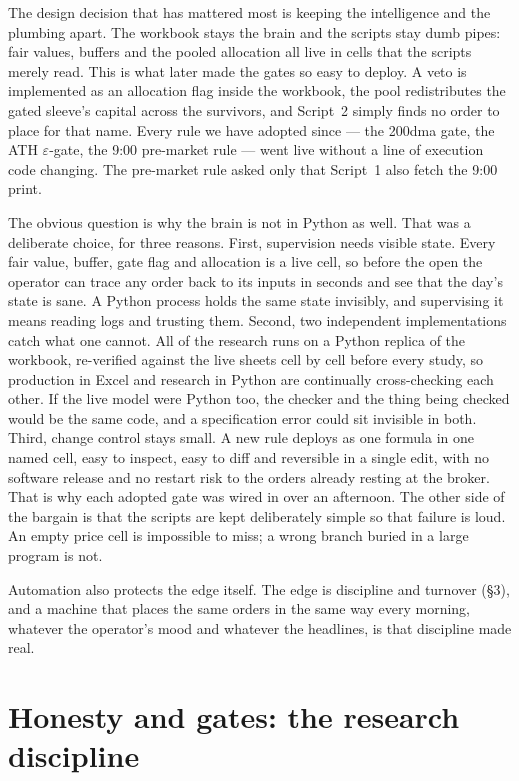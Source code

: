 \documentclass[11pt,a4paper]{article}
\begin{document}
The design decision that has mattered most is keeping the intelligence and
the plumbing apart. The workbook stays the brain and the scripts stay dumb
pipes: fair values, buffers and the pooled allocation all live in cells that
the scripts merely read. This is what later made the gates so easy to deploy.
A veto is implemented as an allocation flag inside the workbook, the pool
redistributes the gated sleeve's capital across the survivors, and Script~2
simply finds no order to place for that name. Every rule we have adopted
since --- the 200dma gate, the ATH $\varepsilon$-gate, the 9:00 pre-market
rule --- went live without a line of execution code changing. The pre-market
rule asked only that Script~1 also fetch the 9:00 print.

The obvious question is why the brain is not in Python as well. That was a
deliberate choice, for three reasons. First, supervision needs visible state.
Every fair value, buffer, gate flag and allocation is a live cell, so before
the open the operator can trace any order back to its inputs in seconds and
see that the day's state is sane. A Python process holds the same state
invisibly, and supervising it means reading logs and trusting them. Second,
two independent implementations catch what one cannot. All of the research
runs on a Python replica of the workbook, re-verified against the live
sheets cell by cell before every study, so production in Excel and research
in Python are continually cross-checking each other. If the live model were
Python too, the checker and the thing being checked would be the same code,
and a specification error could sit invisible in both. Third, change control
stays small. A new rule deploys as one formula in one named cell, easy to
inspect, easy to diff and reversible in a single edit, with no software
release and no restart risk to the orders already resting at the broker.
That is why each adopted gate was wired in over an afternoon. The other side
of the bargain is that the scripts are kept deliberately simple so that
failure is loud. An empty price cell is impossible to miss; a wrong branch
buried in a large program is not.

Automation also protects the edge itself. The edge is discipline and
turnover (\S3), and a machine that places the same orders in the same way
every morning, whatever the operator's mood and whatever the headlines, is
that discipline made real.

\section{Honesty and gates: the research discipline}
\end{document}
